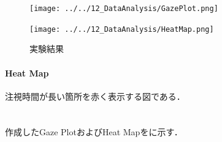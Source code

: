 \begin{figure}
    \centering
    \begin{minipage}[b]{.2\textwidth}
        \centering
        \texttt{[image: ../../12\_DataAnalysis/GazePlot.png]}
    \end{minipage}
    \begin{minipage}[b]{.2\textwidth}
        \centering
        \texttt{[image: ../../12\_DataAnalysis/HeatMap.png]}
    \end{minipage}
    \caption{\kadaid 実験結果}
    \label{fig:実験結果\kadaid}
\end{figure}
\paragraph{Heat Map}
注視時間が長い箇所を赤く表示する図である．
\section{\result}
作成したGaze PlotおよびHeat Mapをに示す．
\section{\consideration}
